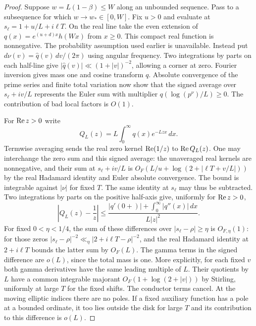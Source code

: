 \documentclass[11pt]{article}
\begin{document}
\begin{proof}
Suppose $w=L(1-\beta)\le W$ along an unbounded sequence. Pass to a subsequence for which $w\to w_*\in[0,W]$. Fix $u>0$ and evaluate at $s_\ell=1+u/L+i\ell T$. On the real line take the even extension of $q(x)=e^{(u+d)x}h(Wx)$ from $x\ge0$. This compact real function is nonnegative. The probability assumption used earlier is unavailable. Instead put $d\nu(v)=\widehat q(v)\,dv/(2\pi)$ using angular frequency. Two integrations by parts on each half-line give $|\widehat q(v)|\ll(1+|v|)^{-2}$, allowing a corner at zero. Fourier inversion gives mass one and cosine transform $q$. Absolute convergence of the prime series and finite total variation now show that the signed average over $s_\ell+iv/L$ represents the Euler sum with multiplier $q(\log(p^\nu)/L)\ge0$. The contribution of bad local factors is $O(1)$.
 
For $\operatorname{Re} z>0$ write
\[
 Q_L(z)=L\int_0^\infty q(x)e^{-Lzx}\,dx .
\]
Termwise averaging sends the real zero kernel $\operatorname{Re}(1/z)$ to $\operatorname{Re} Q_L(z)$. One may interchange the zero sum and this signed average: the unaveraged real kernels are nonnegative, and their sum at $s_\ell+iv/L$ is $O_F(L/u+\log(2+|\ell T+v/L|))$ by the real Hadamard identity and Euler absolute convergence. The bound is integrable against $|\nu|$ for fixed $T$. The same identity at $s_\ell$ may thus be subtracted. Two integrations by parts on the positive half-axis give, uniformly for $\operatorname{Re} z>0$,
\[
 \left|Q_L(z)-\frac1z\right|
 \le\frac{|q'(0+)|+\int_0^\infty |q''(x)|\,dx}{L|z|^2}.
\]
For fixed $0<\eta<1/4$, the sum of these differences over $|s_\ell-\rho|\ge\eta$ is $O_{F,\eta}(1)$: for those zeros $|s_\ell-\rho|^{-2}\ll_\eta |2+i\ell T-\rho|^{-2}$, and the real Hadamard identity at $2+i\ell T$ bounds the latter sum by $O_F(L)$. The gamma terms in the signed difference are $o(L)$, since the total mass is one. More explicitly, for each fixed $v$ both gamma derivatives have the same leading multiple of $L$. Their quotients by $L$ have a common integrable majorant $O_F(1+\log(2+|v|))$ by Stirling, uniformly at large $T$ for the fixed shifts. The conductor terms cancel. At the moving elliptic indices there are no poles. If a fixed auxiliary function has a pole at a bounded ordinate, it too lies outside the disk for large $T$ and its contribution to this difference is $o(L)$.


\end{proof}
\end{document}
